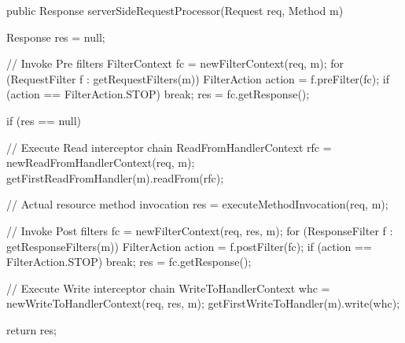 \begin{listing}{1}
public Response serverSideRequestProcessor(Request req, Method m) {
    Response res = null;

    // Invoke Pre filters
    FilterContext fc = newFilterContext(req, m);
    for (RequestFilter f : getRequestFilters(m)) {
        FilterAction action = f.preFilter(fc);
        if (action == FilterAction.STOP) break;
    }
    res = fc.getResponse();

    if (res == null) {
        // Execute Read interceptor chain
        ReadFromHandlerContext rfc = newReadFromHandlerContext(req, m);
        getFirstReadFromHandler(m).readFrom(rfc);

        // Actual resource method invocation
        res = executeMethodInvocation(req, m);
    }

    // Invoke Post filters
    fc = newFilterContext(req, res, m);
    for (ResponseFilter f : getResponseFilters(m)) {
        FilterAction action = f.postFilter(fc);
        if (action == FilterAction.STOP) break;
    }
    res = fc.getResponse();       

    // Execute Write interceptor chain
    WriteToHandlerContext whc = newWriteToHandlerContext(req, res, m);
    getFirstWriteToHandler(m).write(whc);

    return res;
}
\end{listing}
